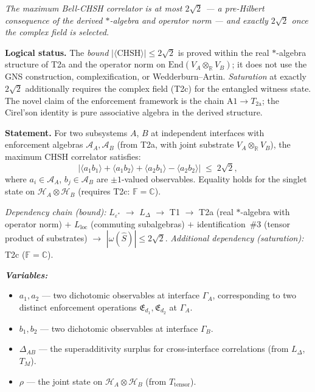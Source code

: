 \documentclass[11pt]{article}
\theoremstyle{remark}
\newenvironment{varlist}{\begin{itemize}[nosep,leftmargin=2em]}{\end{itemize}}
\begin{document}
\begin{tcolorbox}[apfbox, title={$T_{\mathrm{Tsirelson}}$: CHSH Bound from Finite Enforcement Capacity}]
\textit{The maximum Bell-CHSH correlator is at most $2\sqrt{2}$ --- a pre-Hilbert consequence of the derived $*$-algebra and operator norm --- and exactly $2\sqrt{2}$ once the complex field is selected.}

\smallskip\noindent\textbf{Logical status.}  The \emph{bound} $|\langle\mathrm{CHSH}\rangle| \le 2\sqrt{2}$ is proved within the real $*$-algebra structure of T2a and the operator norm on $\mathrm{End}(V_A \otimes_\mathbb{R} V_B)$; it does not use the GNS construction, complexification, or Wedderburn--Artin.  \emph{Saturation} at exactly $2\sqrt{2}$ additionally requires the complex field (T2c) for the entangled witness state.  The novel claim of the enforcement framework is the chain $\mathrm{A1} \to T_{2\mathrm{a}}$; the Cirel'son identity is pure associative algebra in the derived structure.

\smallskip\noindent\textbf{Statement.}  For two subsystems $A$, $B$ at independent interfaces with enforcement algebras $\mathcal{A}_A, \mathcal{A}_B$ (from T2a, with joint substrate $V_A \otimes_\mathbb{R} V_B$), the maximum CHSH correlator satisfies:
\begin{equation}
\bigl|\langle a_1 b_1 \rangle + \langle a_1 b_2 \rangle + \langle a_2 b_1 \rangle - \langle a_2 b_2 \rangle\bigr| \;\le\; 2\sqrt{2},
\end{equation}
where $a_i \in \mathcal{A}_A$, $b_j \in \mathcal{A}_B$ are $\pm 1$-valued observables.  Equality holds for the singlet state on $\mathcal{H}_A \otimes \mathcal{H}_B$ (requires T2c: $\mathbb{F} = \mathbb{C}$).

\smallskip\noindent\textit{Dependency chain (bound):} $L_{\varepsilon^*}$ $\to$ $L_\Delta$ $\to$ T1 $\to$ T2a (real $*$-algebra with operator norm) $+$ $L_{\mathrm{loc}}$ (commuting subalgebras) $+$ identification~\#3 (tensor product of substrates) $\to$ $|\omega(\hat{S})| \le 2\sqrt{2}$.  \textit{Additional dependency (saturation):} T2c ($\mathbb{F} = \mathbb{C}$).

\smallskip\noindent\textbf{\textit{Variables:}}
\begin{varlist}
  \item $a_1, a_2$ --- two dichotomic observables at interface $\Gamma_A$, corresponding to two distinct enforcement operations $\mathfrak{E}_{d_1}, \mathfrak{E}_{d_2}$ at $\Gamma_A$.
  \item $b_1, b_2$ --- two dichotomic observables at interface $\Gamma_B$.
  \item $\Delta_{AB}$ --- the superadditivity surplus for cross-interface correlations (from $L_\Delta$, $T_M$).
  \item $\rho$ --- the joint state on $\mathcal{H}_A \otimes \mathcal{H}_B$ (from $T_{\mathrm{tensor}}$).
\end{varlist}


\end{tcolorbox}
\end{document}
